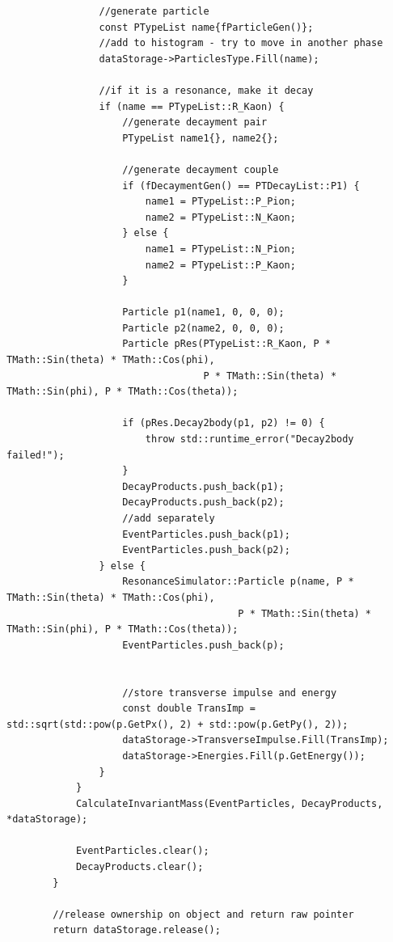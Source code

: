 \documentclass[12pt, a4paper]{article}
\begin{document}
\begin{verbatim}
                //generate particle
                const PTypeList name{fParticleGen()};
                //add to histogram - try to move in another phase
                dataStorage->ParticlesType.Fill(name);

                //if it is a resonance, make it decay
                if (name == PTypeList::R_Kaon) {
                    //generate decayment pair
                    PTypeList name1{}, name2{};

                    //generate decayment couple
                    if (fDecaymentGen() == PTDecayList::P1) {
                        name1 = PTypeList::P_Pion;
                        name2 = PTypeList::N_Kaon;
                    } else {
                        name1 = PTypeList::N_Pion;
                        name2 = PTypeList::P_Kaon;
                    }

                    Particle p1(name1, 0, 0, 0);
                    Particle p2(name2, 0, 0, 0);
                    Particle pRes(PTypeList::R_Kaon, P * TMath::Sin(theta) * TMath::Cos(phi),
                                  P * TMath::Sin(theta) * TMath::Sin(phi), P * TMath::Cos(theta));

                    if (pRes.Decay2body(p1, p2) != 0) {
                        throw std::runtime_error("Decay2body failed!");
                    }
                    DecayProducts.push_back(p1);
                    DecayProducts.push_back(p2);
                    //add separately
                    EventParticles.push_back(p1);
                    EventParticles.push_back(p2);
                } else {
                    ResonanceSimulator::Particle p(name, P * TMath::Sin(theta) * TMath::Cos(phi),
                                        P * TMath::Sin(theta) * TMath::Sin(phi), P * TMath::Cos(theta));
                    EventParticles.push_back(p);
                    
                    
                    //store transverse impulse and energy
                    const double TransImp = std::sqrt(std::pow(p.GetPx(), 2) + std::pow(p.GetPy(), 2));
                    dataStorage->TransverseImpulse.Fill(TransImp);
                    dataStorage->Energies.Fill(p.GetEnergy());
                }
            }
            CalculateInvariantMass(EventParticles, DecayProducts, *dataStorage);

            EventParticles.clear();
            DecayProducts.clear();
        }

        //release ownership on object and return raw pointer
        return dataStorage.release();


\end{verbatim}
\end{document}
